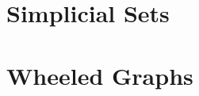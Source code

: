 \documentclass[../../../deep-dive]{subfiles}
\begin{document}
\chapter{Simplicial Sets}



\chapter{Wheeled Graphs}


\end{document}
